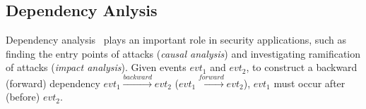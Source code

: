 \subsection{Dependency Anlysis}
Dependency analysis~\cite{backtracking,backtrackingfile,backtracking2} plays an important role in security applications,
such as finding the entry points of attacks (\emph{causal analysis})
and investigating ramification of attacks (\emph{impact analysis}).
Given events $evt_1$ and $evt_2$, to construct a backward (forward) dependency $evt_1\xrightarrow{backward} evt_2$ ($evt_1\xrightarrow{forward} evt_2$), $evt_1$ must occur after (before) $evt_2$.


